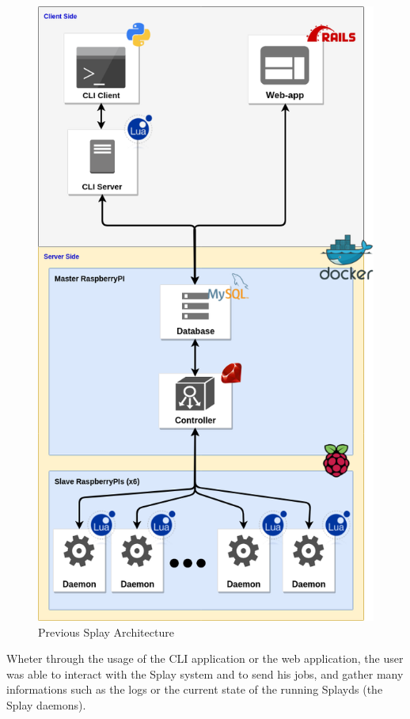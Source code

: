 \documentclass{eplmastersthesis}
\begin{document}
        \begin{figure}[H]
          \centering
          \includegraphics[scale=0.6]{figures/prev_arch.png}
          \caption{\label{prev_arch} Previous Splay Architecture}
        \end{figure}

        Wheter through the usage of the CLI application or the web application,
        the user was able to interact with the Splay system and to send his
        jobs, and gather many informations such as the logs or the current
        state of the running Splayds (the Splay daemons).
\end{document}
